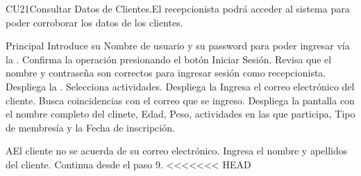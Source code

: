

\begin{UseCase}{CU21}{Consultar Datos de Clientes.}{El recepcionista podrá acceder al sistema para poder corroborar los datos de los clientes.}
	\end{UseCase}
	\begin{UCtrayectoria}{Principal}
		\UCpaso[\UCactor] Introduce su Nombre de usuario y su password para poder ingresar vía la  \label{CU1LoginJI}.
		\UCpaso[\UCactor] Confirma la operación presionando el botón Iniciar Sesión.
		\UCpaso Revisa que el nombre y contraseña son correctos para ingresar sesión como recepcionista.
		\UCpaso Despliega la .
		\UCpaso[\UCactor]Selecciona actividades.
		\UCpaso Despliega la 
		\UCpaso[\UCactor]Ingresa el correo electrónico del cliente.
		\UCpaso Busca coincidencias con el correo que se ingreso.
		\UCpaso Despliega la pantalla con el nombre completo del clinete, Edad, Peso, actividades en las que participa, Tipo de membresía y la Fecha de inscripción.
	\end{UCtrayectoria}

		\begin{UCtrayectoriaA}{A}{El cliente no se acuerda de su correo electrónico.}
			\UCpaso[\UCactor] Ingresa el nombre y apellidos del cliente.
			\UCpaso Continua desde el paso 9.
<<<<<<< HEAD
		\end{UCtrayectoriaA}
		
